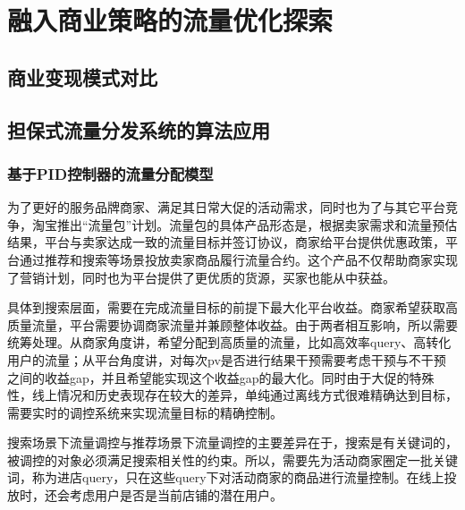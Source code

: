 
\chapter{ 融入商业策略的流量优化探索 }
\thispagestyle{empty}

\setlength{\fboxrule}{0pt}\setlength{\fboxsep}{0cm}
\noindent\shadowbox{
\begin{tcolorbox}[arc=0mm,colback=lightblue,colframe=darkblue,title=学习目标与要求]

\end{tcolorbox}}
\setlength{\fboxrule}{1pt}\setlength{\fboxsep}{4pt} 


\section{商业变现模式对比} 




\section{担保式流量分发系统的算法应用}
\subsection {基于PID控制器的流量分配模型}
为了更好的服务品牌商家、满足其日常大促的活动需求，同时也为了与其它平台竞争，淘宝推出“流量包”计划。流量包的具体产品形态是，根据卖家需求和流量预估结果，平台与卖家达成一致的流量目标并签订协议，商家给平台提供优惠政策，平台通过推荐和搜索等场景投放卖家商品履行流量合约。这个产品不仅帮助商家实现了营销计划，同时也为平台提供了更优质的货源，买家也能从中获益。

具体到搜索层面，需要在完成流量目标的前提下最大化平台收益。商家希望获取高质量流量，平台需要协调商家流量并兼顾整体收益。由于两者相互影响，所以需要统筹处理。从商家角度讲，希望分配到高质量的流量，比如高效率query、高转化用户的流量；从平台角度讲，对每次pv是否进行结果干预需要考虑干预与不干预之间的收益gap，并且希望能实现这个收益gap的最大化。同时由于大促的特殊性，线上情况和历史表现存在较大的差异，单纯通过离线方式很难精确达到目标，需要实时的调控系统来实现流量目标的精确控制。

搜索场景下流量调控与推荐场景下流量调控的主要差异在于，搜索是有关键词的，被调控的对象必须满足搜索相关性的约束。所以，需要先为活动商家圈定一批关键词，称为进店query，只在这些query下对活动商家的商品进行流量控制。在线上投放时，还会考虑用户是否是当前店铺的潜在用户。

